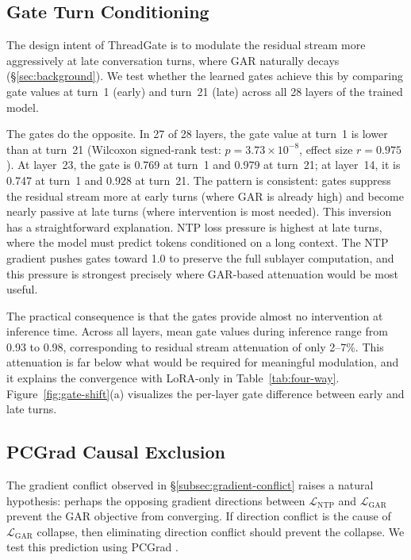 \subsection{Gate Turn Conditioning}\label{subsec:gate-conditioning}

The design intent of ThreadGate is to modulate the residual stream more aggressively at late conversation turns, where GAR naturally decays (\S\ref{sec:background}). We test whether the learned gates achieve this by comparing gate values at turn~1 (early) and turn~21 (late) across all 28 layers of the trained model.

The gates do the opposite. In 27 of 28 layers, the gate value at turn~1 is lower than at turn~21 (Wilcoxon signed-rank test: $p = 3.73 \times 10^{-8}$, effect size $r = 0.975$). At layer~23, the gate is 0.769 at turn~1 and 0.979 at turn~21; at layer~14, it is 0.747 at turn~1 and 0.928 at turn~21. The pattern is consistent: gates suppress the residual stream more at early turns (where GAR is already high) and become nearly passive at late turns (where intervention is most needed). This inversion has a straightforward explanation. NTP loss pressure is highest at late turns, where the model must predict tokens conditioned on a long context. The NTP gradient pushes gates toward 1.0 to preserve the full sublayer computation, and this pressure is strongest precisely where GAR-based attenuation would be most useful.

The practical consequence is that the gates provide almost no intervention at inference time. Across all layers, mean gate values during inference range from 0.93 to 0.98, corresponding to residual stream attenuation of only 2--7\%. This attenuation is far below what would be required for meaningful modulation, and it explains the convergence with LoRA-only in Table~\ref{tab:four-way}. Figure~\ref{fig:gate-shift}(a) visualizes the per-layer gate difference between early and late turns.

\subsection{PCGrad Causal Exclusion}\label{subsec:pcgrad}

The gradient conflict observed in \S\ref{subsec:gradient-conflict} raises a natural hypothesis: perhaps the opposing gradient directions between $\mathcal{L}_\text{NTP}$ and $\mathcal{L}_\text{GAR}$ prevent the GAR objective from converging. If direction conflict is the cause of $\mathcal{L}_\text{GAR}$ collapse, then eliminating direction conflict should prevent the collapse. We test this prediction using PCGrad \citep{yu2020pcgrad}.

